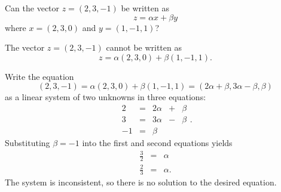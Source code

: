 \documentclass{ximera}
\begin{document}
\begin{exercise} \label{c4.3.4}
Can the vector $z=(2,3,-1)$ be written as
\[
z=\alpha x+ \beta y
\]
where $x=(2,3,0)$ and $y=(1,-1,1)$?

\begin{solution}

\ans The vector $z = (2,3,-1)$ cannot be written as
\[
z = \alpha(2,3,0) + \beta(1,-1,1).
\]

\soln Write the equation
\[ (2,3,-1) = \alpha(2,3,0) + \beta(1,-1,1) = 
(2\alpha + \beta, 3\alpha - \beta, \beta) \]
as a linear system of two unknowns in three equations:
\[ \begin{array}{rrrrr}
2 & = & 2\alpha & + & \beta \\
3 & = & 3\alpha & - & \beta \\
-1 & = & \beta \end{array}. \]
Substituting $\beta = -1$ into the first and second equations
yields
\[ \begin{array}{rcl}
\frac{3}{2} & = & \alpha \\
\frac{2}{3} & = & \alpha. \end{array} \]
The system is inconsistent, so there is no solution to the desired
equation.

\end{solution}
\end{exercise}
\end{document}
